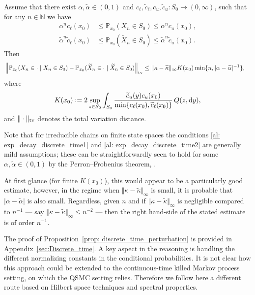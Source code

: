 \documentclass{aptpub}
\begin{document}
\begin{proposition} \label{prop: discrete_time_perturbation}
Assume that there exist $\alpha,\widetilde{\alpha}\in (0,1)$ and $c_\ell,\widetilde{c}_\ell,c_u,\widetilde{c}_u\colon S_0 \to (0,\infty)$, such that for any $n\in\mathbb{N}$ we have
\begin{align}
\label{al: exp_decay_discrete_time1}
\alpha^n c_\ell(x_0) & \leq \mathbb{P}_{x_0}(X_n\in S_0) \leq \alpha^n c_u(x_0),\\
\label{al: exp_decay_discrete_time2}
    \widetilde\alpha^n \widetilde c_\ell(x_0) & \leq \mathbb{P}_{x_0}(\widetilde{X}_n\in S_0) \leq \widetilde\alpha^n \widetilde c_u(x_0).
\end{align}
Then
	\begin{align*}
  &	\left \Vert \mathbb{P}_{x_0}(X_n\in \cdot\mid X_n\in S_0) - \mathbb{P}_{x_0}(\widetilde{X}_n\in \cdot\mid \widetilde{X}_n\in S_0)\right \Vert_{\text{\rm tv}} 
	\leq   \Vert \kappa - \widetilde{\kappa} \Vert_{\infty} K(x_0) \min\{n,\vert \alpha-\widetilde{\alpha} \vert^{-1}\}, \end{align*}
	where 
	\[
		K(x_0) := 2 \sup_{z\in S_0} \int_{S_0}  \frac{\widetilde{c}_u(y) c_u(x_0)}{\min\{c_\ell(x_0),\widetilde{c}_\ell(x_0)\}}\, Q(z,{\rm d} y),
	\]
	and $\Vert \cdot \Vert_{\text{\rm tv}}$ denotes the total variation distance.
\end{proposition}
Note that for irreducible chains on finite state spaces the conditions \eqref{al: exp_decay_discrete_time1} and \eqref{al: exp_decay_discrete_time2} are generally mild assumptions; these can be straightforwardly seen to hold for some $\alpha, \widetilde \alpha\in (0,1)$ by the Perron--Frobenius theorem, \cite{Seneta2006}.


At first glance (for finite $K(x_0)$), this would appear to be a particularly good estimate, however, in the regime when $\Vert \kappa - \widetilde{\kappa} \Vert_{\infty}$
is small, it is probable that $\vert \alpha-\widetilde{\alpha} \vert$ is also small. Regardless, given $n$ and if $\Vert \kappa - \widetilde{\kappa} \Vert_{\infty}$ is negligible compared to $n^{-1}$ --- say $\Vert \kappa - \widetilde{\kappa} \Vert_{\infty}\leq n^{-2}$ --- then the right hand-side of the stated estimate is of order $n^{-1}$.

The proof of Proposition~\ref{prop: discrete_time_perturbation} is provided in Appendix~\ref{sec:Discrete_time}. A key aspect in the reasoning is handling the different normalizing constants in the conditional probabilities. 
It is not clear how this
approach could be extended to the continuous-time killed Markov process setting, on which the QSMC setting relies. Therefore we follow here a different route based on Hilbert space techniques and spectral properties.
\end{document}
